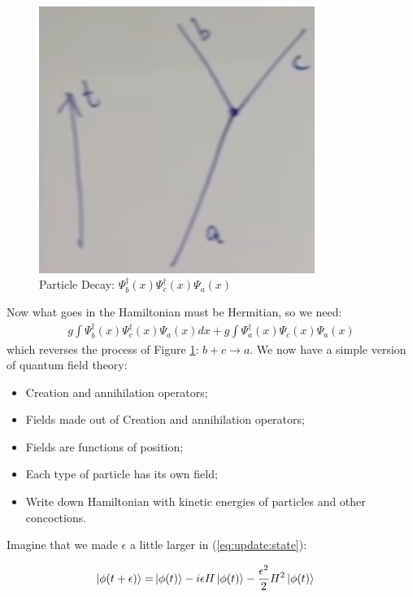 \documentclass[]{article}
\begin{document}
\begin{figure}[H]
	\caption{Particle Decay: $\Psi^\dagger_b(x) \Psi^\dagger_c(x) \Psi_a(x)$}\label{fig:particle:decay}
	\includegraphics[width=0.8\textwidth]{particle_decay}
\end{figure}

Now what goes in the Hamiltonian must be Hermitian, so we need:
\begin{align*}
g \int \Psi^\dagger_b(x) \Psi^\dagger_c(x) \Psi_a(x) dx + g \int \Psi^\dagger_a(x) \Psi_c(x) \Psi_a(x)
\end{align*}
which reverses the process of  Figure \ref{fig:particle:decay}: $b+c\rightarrow a$.
We now have a simple version of quantum field theory:
\begin{itemize}
	\item Creation and annihilation operators;
	\item Fields made out of Creation and annihilation operators;
	\item Fields are functions of position;
	\item Each type of particle has its own field;
	\item Write down Hamiltonian with kinetic energies of particles and other concoctions. 
\end{itemize}

Imagine that we made $\epsilon$ a little larger in (\ref{eq:update:state}):

\begin{align*}
\ket{\phi(t+\epsilon)} =& \ket{\phi(t)} -i \epsilon H \ket{\phi(t)} - \frac{\epsilon^2}{2} H^2 \ket{\phi(t)}
\end{align*}
\end{document}
